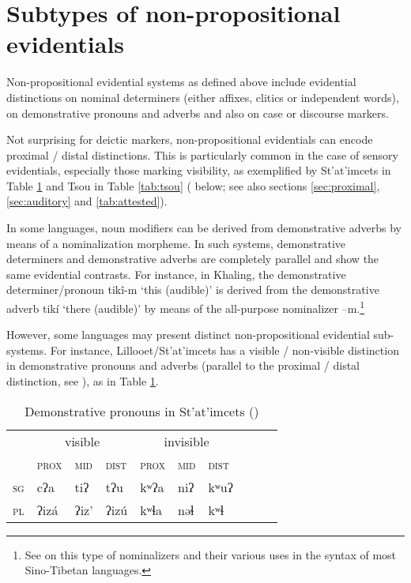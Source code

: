 \documentclass[oneside,a4paper,11pt]{article}
\newcommand{\ipa}[1]{{\phon \mbox{#1}}} %
\begin{document}
\section{Subtypes of non-propositional evidentials} \label{sec:subtypes}
Non-propositional evidential systems as defined above include evidential distinctions on nominal determiners (either affixes, clitics or independent words),  on demonstrative pronouns and adverbs and also on case or discourse markers.

Not surprising for deictic markers, non-propositional evidentials can encode proximal / distal distinctions. This is particularly common in the case of sensory evidentials, especially those marking visibility, as exemplified by St'at'imcets in Table \ref{tab:statimcets.pro} and Tsou in Table \ref{tab:tsou} (\citealt{tung64tsou, yang00tsou.case} below; see also sections \ref{sec:proximal}, \ref{sec:auditory} and \ref{tab:attested}). 

In some languages, noun modifiers can be derived from demonstrative adverbs by means of a nominalization morpheme. In such systems, demonstrative determiners and demonstrative adverbs are completely parallel and show the same evidential contrasts. For instance, in Khaling, the demonstrative determiner/pronoun \ipa{tikî-m} `this (audible)' is derived from the demonstrative adverb \ipa{tikí} `there (audible)' by means of the all-purpose nominalizer \ipa{--m}.\footnote{See \citet{bickel99nmlz} on this type of nominalizers and their various uses in the syntax of most Sino-Tibetan languages.}

However, some languages may present distinct non-propositional evidential sub-systems. For instance, Lillooet/St'at'imcets has a visible / non-visible distinction in demonstrative pronouns and adverbs (parallel to the proximal / distal distinction, see \citealt[168-172]{eijk97lillooet}), as in Table \ref{tab:statimcets.pro}.

\begin{table}[H]
\caption{Demonstrative pronouns in St'at'imcets (\citealt[168-9]{eijk97lillooet})} \label{tab:statimcets.pro} \centering 
\begin{tabular}{l|lll|llllll}
\toprule
& \multicolumn{3}{c}{visible} & \multicolumn{3}{c}{invisible} \\
&\textsc{prox} & \textsc{mid} & \textsc{dist}&\textsc{prox} & \textsc{mid} & \textsc{dist} \\
\midrule
\textsc{sg} & \ipa{cʔa} & \ipa{tiʔ} & \ipa{tʔu} & \ipa{kʷʔa} & \ipa{niʔ} & \ipa{kʷuʔ}  \\
\textsc{pl} & \ipa{ʔizá} & \ipa{ʔiz'} & \ipa{ʔizú} & \ipa{kʷɬa} & \ipa{nəɬ} & \ipa{kʷɬ} \\
\bottomrule
\end{tabular}
\end{table}
\end{document}
